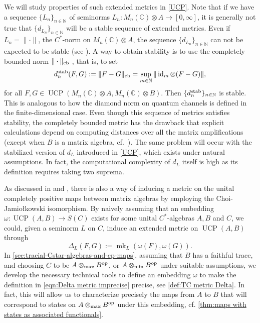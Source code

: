 \documentclass[11pt, a4paper, oneside, final, reqno]{amsart}
\newcommand{\bbN}{\mathbb{N}}
\newcommand{\bbC}{\mathbb{C}}
\newcommand{\UCP}{\operatorname{UCP}}
\newcommand{\id}{\operatorname{id}}
\newcommand{\mk}{\operatorname{mk}}
\theoremstyle{definition}
\theoremstyle{plain}
\theoremstyle{remark}
\numberwithin{equation}{section}
\begin{document}
We will study properties of such extended metrics in \cref{UCP}. Note that if we have a sequence $\{L_n\}_{n \in \bbN}$ of seminorms $L_n \colon M_n(\bbC) \otimes A \to [0, \infty]$, it is generally not true that $\{d_{L_n}\}_{n \in \bbN}$ will be a stable sequence of extended metrics. Even if $L_n = \| \cdot \|$, the $C^*$-norm on $M_n(\bbC) \otimes A$, the sequence $\{d_{L_n}\}_{n \in \bbN}$ can not be expected to be stable (see \cite{Wat05}). A way to obtain stability is to use the completely bounded norm $\|\cdot\|_{\rm cb}$ \cite{Paulsen}, that is, to set
\begin{equation*}\label{eqn:stabilization}
    d_n^{\rm stab}(F,G) := \|F-G\|_{\rm cb} =\sup\limits_{m \in \bbN} \|\id_{m} \otimes (F - G)\|,
\end{equation*}
for all $F, G\in \UCP(M_n(\bbC) \otimes A, M_n(\bbC) \otimes B)$. Then $\{d_n^{\rm stab}\}_{n \in \bbN}$ is stable. This is analogous to how the diamond norm on quantum channels is defined in the finite-dimensional case. Even though this sequence of metrics satisfies stability, the completely bounded metric has the drawback that explicit calculations depend on computing distances over all the matrix amplifications (except when $B$ is a matrix algebra, cf.~\cite{Smith1983}). The same problem will occur with the stabilized version of $d_L$ introduced in \cref{UCP}, which exists under natural assumptions. In fact, the computational complexity of $d_L$ itself is high as its definition  requires taking two suprema.

As discussed in \cite{Gilchrist} and \cite{BorovykVellambi25}, there is also a way of inducing a metric on the unital completely positive maps between matrix algebras by employing the Choi-Jamio\l{}kowski isomorphism. By naively assuming that an embedding $\omega \colon \UCP(A,B) \to S(C)$ exists for some unital $C^*$-algebras $A, B$ and $C$, we could, given a seminorm $L$ on $C$, induce an extended metric on $\UCP(A,B)$ through 
\begin{equation}\label{eqn:Delta metric imprecise}
    \Delta_{L}(F,G) := \mk_L(\omega(F),\omega(G)).
\end{equation}
In \cref{sec:tracial-Cstar-algebras-and-cp-maps}, assuming that $B$ has a faithful trace, and choosing  $C$ to be $A \otimes_{\rm max} B^{\rm op}$, or $A \otimes_{\rm min} B^{\rm op}$ under suitable assumptions, we develop the necessary technical tools to define an embedding $\omega$ to make the definition in \eqref{eqn:Delta metric imprecise} precise, see \cref{def:TC metric Delta}. In fact, this will allow us to characterize precisely the maps from $A$ to $B$ that will correspond to states on $A \otimes_{\rm max} B^{\rm op}$ under this embedding, cf. \cref{thm:maps with states as associated functionals}.
\end{document}
